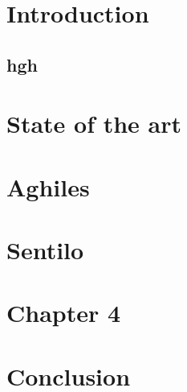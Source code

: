 \documentclass[a4paper, 12pt, twoside,openright]{report}
\begin{document}
\firstpage

\preface
	
	
	
\setcounter{mtc}{1}


\body
	\chapter{Introduction}
	\localtableofcontents
		\section*{hgh}
		

	\chapter{State of the art \cite{bregell_hardware_2015}}
	\localtableofcontents
		
		
		
		
		

	\chapter{Aghiles \cite{bregell_hardware_2015}}
	\localtableofcontents
		
		
		
		
		
		

	\chapter{Sentilo \cite{_contiki_2016a}}
	\localtableofcontents
		
		
		
		
		
		

	\chapter{Chapter 4}
	\localtableofcontents
		
		
		
		
		
		
		
	\chapter{Conclusion}
%		
		
\end{document}
